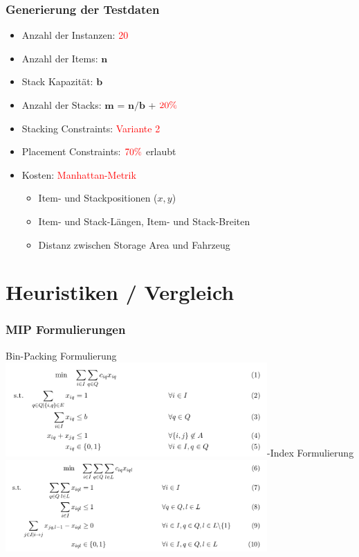 \documentclass{beamer}
\begin{document}
\begin{frame}
\frametitle{Generierung der Testdaten}

\begin{itemize}
  \item Anzahl der Instanzen: \textcolor{red}{20}\newline
  \item Anzahl der Items: $\boldsymbol{n}$
  \item Stack Kapazität: $\boldsymbol{b}$
  \item Anzahl der Stacks: $\boldsymbol{m}$ = $\boldsymbol{n} / \boldsymbol{b}$ + $\textcolor{red}{20 \%}$\newline
  \item Stacking Constraints: \textcolor{red}{Variante 2}
  \item Placement Constraints: $\textcolor{red}{70 \%}$ erlaubt
  \item Kosten: \textcolor{red}{Manhattan-Metrik}
  \begin{itemize}
    \item Item- und Stackpositionen ($x, y$)
    \item Item- und Stack-Längen, Item- und Stack-Breiten
    \item Distanz zwischen Storage Area und Fahrzeug
  \end{itemize}
\end{itemize}
\end{frame}

\section{Heuristiken / Vergleich}

\begin{frame}
\frametitle{MIP Formulierungen}
Bin-Packing Formulierung\newline
\includegraphics[width=0.75\textwidth]{images/BinP.png}-Index Formulierung\newline
\includegraphics[width=0.75\textwidth]{images/3Idx.png}
\end{frame}
\end{document}
